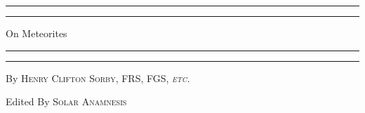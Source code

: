 \documentclass[a4paper, 12pt, oneside]{article}
\begin{document}
\begin{titlepage} %
	\centering %
	\scshape %

	
	\rule{\textwidth}{1.6pt}\vspace*{-\baselineskip}\vspace*{2pt} %
	\rule{\textwidth}{0.4pt} %
	
	\vspace{0.75\baselineskip} %

        {\LARGE On Meteorites \\} %
	
	\vspace{0.75\baselineskip} %
	
	\rule{\textwidth}{0.4pt}\vspace*{-\baselineskip}\vspace{3.2pt} %
	\rule{\textwidth}{1.6pt} %
	
	\vspace{1\baselineskip} %
	
	
	{By \scshape\Large Henry Clifton Sorby, FRS, FGS, \emph{etc.}\\} %
	
	\vspace*{1\baselineskip} %
	

 	{Edited By \scshape Solar Anamnesis\\} %

	\vspace{1\baselineskip} %

	
	

\end{titlepage}
\end{document}
